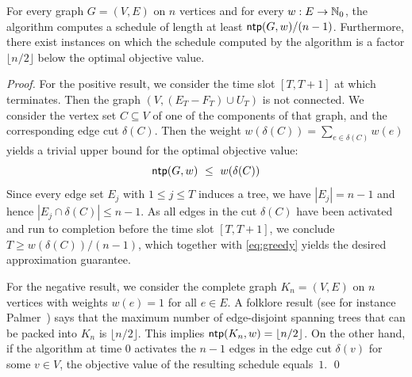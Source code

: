 \begin{theorem}
\label{th:greedy.approx}
For every graph $G=(V,E)$ on $n$ vertices and for every $w:E\to\mathbb{N}_0$, 
the {\greedy} algorithm computes a schedule of length at least $\operatorname{\textsf{ntp}}(G,w)/(n-1)$.
Furthermore, there exist instances on which the schedule computed by the 
{\greedy} algorithm is a factor $\lfloor n/2\rfloor$ below the optimal objective value.
\end{theorem}
\begin{proof}
For the positive result, we consider the time slot $[T,T+1]$ at which {\greedy} terminates.
Then the graph $(V,(E_T-F_T)\cup U_T)$ is not connected.
We consider the vertex set $C\subseteq V$ of one of the components of that graph, and the
corresponding edge cut $\delta(C)$.
Then the weight $w(\delta(C))=\sum_{e\in\delta(C)}w(e)$ yields a trivial upper bound for the 
optimal objective value: 
\begin{equation}
\label{eq:greedy}
\operatorname{\textsf{ntp}}(G,w) ~\le~ w(\delta(C))
\end{equation}
Since every edge set $E_j$ with $1\le j\le T$ induces a tree, we have $|E_j|=n-1$ and hence
$|E_j\cap \delta(C)|\le n-1$.
As all edges in the cut $\delta(C)$ have been activated and run to completion before the 
time slot $[T,T+1]$, we conclude $T\ge w(\delta(C))/(n-1)$, which together with \eqref{eq:greedy}
yields the desired approximation guarantee.

For the negative result, we consider the complete graph $K_n=(V,E)$ on $n$ vertices with 
weights $w(e)=1$ for all $e\in E$.
A folklore result (see for instance Palmer~\cite{Palmer2001}) says that the maximum number of 
edge-disjoint spanning trees that can be packed into $K_n$ is $\lfloor n/2\rfloor$.
This implies $\operatorname{\textsf{ntp}}(K_n,w)=\lfloor n/2\rfloor$.
On the other hand, if the {\greedy} algorithm at time $0$ activates the $n-1$ edges in the edge
cut $\delta(v)$ for some $v\in V$, the objective value of the resulting schedule equals~$1$.
\qed
\end{proof}


